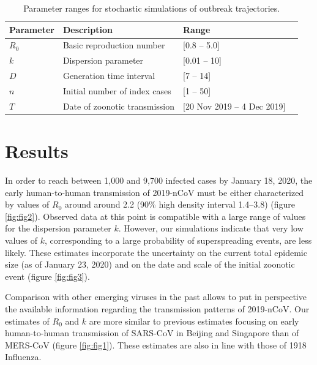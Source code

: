 \documentclass{article}
\begin{document}
\begin{table}
	\centering
	\caption{Parameter ranges for stochastic simulations of outbreak trajectories.}
	\label{fig:tab1}
\begin{tabular}{llll}
	\hline
	Parameter & Description & Range   \\
	\hline 
	$R_0$& Basic reproduction number  &[0.8 -- 5.0] \\ 
	$k$ & Dispersion parameter & [0.01 -- 10] \\
	$D$ & Generation time interval & [7 -- 14]  \\
	$n$ & Initial number of index cases & [1 -- 50]  \\
	$T$ & Date of zoonotic transmission & [20 Nov 2019 -- 4 Dec 2019] \\
	
	\hline 
\end{tabular} 
\end{table}

\section{Results}
In order to reach between 1,000 and 9,700 infected cases by January 18, 2020, the early human-to-human transmission of 2019-nCoV must be either characterized by values of $R_0$ around around 2.2 (90\% high density interval 1.4--3.8) (figure \ref{fig:fig2}).
Observed data at this point is compatible with a large range of values for the dispersion parameter $k$. 
However, our simulations indicate that very low values of $k$, corresponding to a large probability of superspreading events, are less likely.
These estimates incorporate the uncertainty on the current total epidemic size (as of January 23, 2020) and on the date and scale of the initial zoonotic event (figure \ref{fig:fig3}).

Comparison with other emerging viruses in the past allows to put in perspective the available information regarding the transmission patterns of 2019-nCoV.
Our estimates of $R_0$ and $k$ are more similar to previous estimates focusing on early human-to-human transmission of SARS-CoV in Beijing and Singapore\cite{Lloyd-Smith:2005} than of MERS-CoV\cite{Kucharski:2015b} (figure \ref{fig:fig1}).
These estimates are also in line with those of 1918 Influenza.\cite{Fraser:2011}


\end{document}
